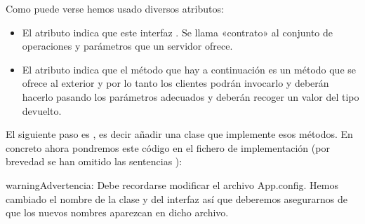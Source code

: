 \documentclass[letterpaper,10pt,spanish]{sphinxmanual}
\begin{document}
Como puede verse hemos usado diversos atributos:
\begin{itemize}
\item {} 
El atributo \sphinxcode{\sphinxupquote{{[}ServiceContract{]}}} indica que este interfaz . Se llama «contrato» al conjunto de operaciones y parámetros que un servidor ofrece.

\item {} 
El atributo \sphinxcode{\sphinxupquote{{[}OperationContract{]}}} indica que el método que hay a continuación es un método que se ofrece al exterior y por lo tanto los clientes podrán invocarlo y deberán hacerlo pasando los parámetros adecuados y deberán recoger un valor del tipo devuelto.

\end{itemize}

El siguiente paso es , es decir añadir una clase que implemente esos métodos. En concreto ahora pondremos este código en el fichero de implementación  (por brevedad se han omitido las sentencias ):

%
\begin{sphinxVerbatim}[commandchars=\\\{\}]
 
        
           
            \PYG{p}{[}\PYG{p}{]}   
              

           
             
\end{sphinxVerbatim}

\begin{sphinxadmonition}{warning}{Advertencia:}
Debe recordarse modificar el archivo App.config. Hemos cambiado el nombre de la clase y del interfaz así que deberemos asegurarnos de que los nuevos nombres aparezcan en dicho archivo.
\end{sphinxadmonition}
\end{document}
